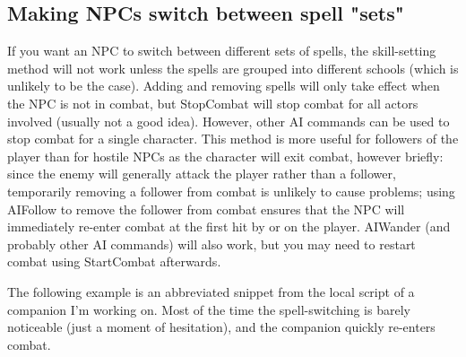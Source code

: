 

\hypertarget{making-npcs-switch-between-spell-sets}{%
\subsection{Making NPCs switch between spell
"sets"}\label{making-npcs-switch-between-spell-sets}}

If you want an NPC to switch between different sets of spells, the
skill-setting method will not work unless the spells are grouped into
different schools (which is unlikely to be the case). Adding and
removing spells will only take effect when the NPC is not in combat, but
StopCombat will stop combat for all actors involved (usually not a good
idea). However, other AI commands can be used to stop combat for a
single character. This method is more useful for followers of the player
than for hostile NPCs as the character will exit combat, however
briefly: since the enemy will generally attack the player rather than a
follower, temporarily removing a follower from combat is unlikely to
cause problems; using AIFollow to remove the follower from combat
ensures that the NPC will immediately re-enter combat at the first hit
by or on the player. AIWander (and probably other AI commands) will also
work, but you may need to restart combat using StartCombat afterwards.

The following example is an abbreviated snippet from the local script of
a companion I'm working on. Most of the time the spell-switching is
barely noticeable (just a moment of hesitation), and the companion
quickly re-enters combat.

